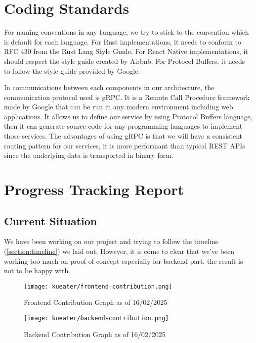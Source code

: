 \section{Coding Standards}
\label{section:coding-standards}
For naming conventions in any language, we try to stick to the convention which is default for each language.
For Rust implementations, it needs to conform to RFC 430 from the Rust Lang Style Guide. \cite{rustlangstyleguide}
For React Native implementations, it should respect the style guide created by Airbnb. \cite{airbnbreactstyleguide}
For Protocol Buffers, it needs to follow the style guide provided by Google. \cite{protobufstyleguide}

In communications between each components in our architecture, the communication protocol used is gRPC. It is a Remote Call Procedure framework made by Google that can be run
in any modern environment including web applications. It allows us to define our service by using Protocol Buffers language, then it can generate source code for
any programming languages to implement those services.
The advantages of using gRPC is that we will have a consistent routing pattern for our services, it is more performant than typical REST APIs
since the underlying data is transported in binary form.

\section{Progress Tracking Report}
\label{section:progress-tracking-report}
\subsection{Current Situation}
We have been working on our project and trying to follow the timeline (\ref{section:timeline}) we laid out. However, it is come to clear that
we've been working too much on proof of concept especially for backend part, the result is not to be happy with.

\begin{figure}[H]
    \centering
    \texttt{[image: kueater/frontend-contribution.png]}
    \caption{Frontend Contribution Graph as of 16/02/2025}
    \label{fig:frontend-contribution}
\end{figure}

\begin{figure}[H]
    \centering
    \texttt{[image: kueater/backend-contribution.png]}
    \caption{Backend Contribution Graph as of 16/02/2025}
    \label{fig:backend-contribution}
\end{figure}

